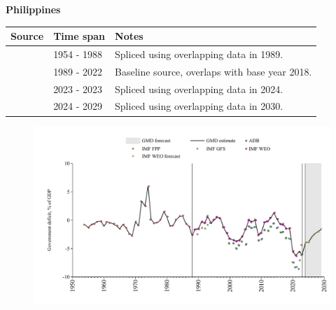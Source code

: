 \documentclass[12pt,a4paper,landscape]{article}
\begin{document}
\begin{adjustbox}{max totalsize={\paperwidth}{\paperheight},center}
\begin{minipage}[t][\textheight][t]{\textwidth}
\vspace*{0.5cm}
{}
\begin{center}
{\Large\bfseries Philippines}
\end{center}
\vspace{0.5cm}
\begin{table}[H]
\centering
\small
\begin{tabular}{|l|l|l|}
\hline
\textbf{Source} & \textbf{Time span} & \textbf{Notes} \\
\hline
\rowcolor{white}\cite{IMF_FPP}& 1954 - 1988 &Spliced using overlapping data in 1989.\\
\rowcolor{lightgray}\cite{IMF_WEO}& 1989 - 2022 &Baseline source, overlaps with base year 2018.\\
\rowcolor{white}\cite{IMF_GFS}& 2023 - 2023 &Spliced using overlapping data in 2024.\\
\rowcolor{lightgray}\cite{IMF_WEO_forecast}& 2024 - 2029 &Spliced using overlapping data in 2030.\\
\hline
\end{tabular}
\end{table}
\begin{figure}[H]
\centering
\includegraphics[width=\textwidth,height=0.6\textheight,keepaspectratio]{graphs/PHL_govdef_GDP.pdf}
\end{figure}
\end{minipage}
\end{adjustbox}
\end{document}
